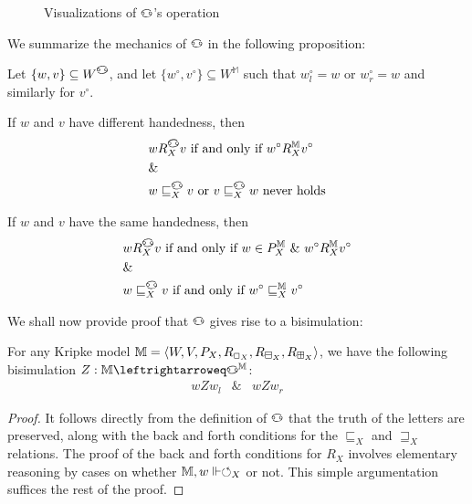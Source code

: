 \begin{figure}[ht]
{\label{fig:bisim3}
}

\caption{Visualizations of $\invis$'s operation}
\end{figure}

We summarize the mechanics of $\invis$ in the following proposition:
\begin{proposition}\label{inviskey}
Let $\{w, v\}\subseteq W^\invis$, and let $\{w^\circ, v^\circ\}
\subseteq W^\mathbb{M}$ such that $w^\circ_l = w$ or $w^\circ_r = w$
and similarly for $v^\circ$.
\begin{mynum}
\item If $w$ and $v$ have different handedness, then
\begin{eqnarray*}
&w R^\invis_X v\textup{ if and only if } w^\circ R^\mathbb{M}_X
v^\circ \\
& \& \\
&w \sqsubseteq^\invis_X v\textup{ or }v \sqsubseteq^\invis_X w  \textup{ never holds}
\end{eqnarray*}
\item If $w$ and $v$ have the same handedness, then 
\begin{eqnarray*}
&w R^\invis_X v \textup{ if and only if } w \in
P_X^\mathbb{M}\ \& \ w^\circ R^\mathbb{M}_X v^\circ \\
& \& \\
&w \sqsubseteq^\invis_X v\textup{ if and only if }  w^\circ \sqsubseteq^\mathbb{M}_X v^\circ 
\end{eqnarray*}
\end{mynum}
\end{proposition}

We shall now provide proof that $\invis$ gives rise to a bisimulation:

\begin{lemma}\label{bisimulation}
For any Kripke model $\mathbb{M} = \langle W,V,P_X,R_{\Box_X},R_{\boxminus_X}, R_{\boxplus_X}\rangle$, we have the following bisimulation $Z: \mathbb{M} \leftrightarroweq \invis^\mathbb{M}$:
\begin{eqnarray*} w Z w_l & \& & w Z w_r \end{eqnarray*}
\end{lemma}
\begin{proof}
  It follows directly from the definition of $\invis$ that the truth
  of the letters are preserved, along
  with the back and forth conditions for the $\sqsubseteq_X$ and
  $\sqsupseteq_X$ relations.  The proof of the back and forth
  conditions for $R_X$ involves elementary reasoning by cases on whether
  $\mathbb{M}, w \Vdash \circlearrowleft_X$ or not. This simple argumentation 
  suffices the rest of the proof.
\end{proof}

